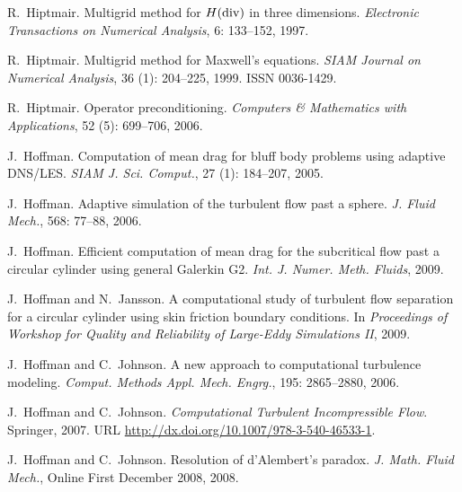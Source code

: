 \begin{thebibliography}{467}
R.~Hiptmair.
\newblock Multigrid method for {$H({\rm div})$} in three dimensions.
\newblock \emph{Electronic Transactions on Numerical Analysis}, 6:
  133--152, 1997.

R.~Hiptmair.
\newblock Multigrid method for {M}axwell's equations.
\newblock \emph{SIAM Journal on Numerical Analysis}, 36 (1):
  204--225, 1999.
\newblock ISSN 0036-1429.

R.~Hiptmair.
\newblock Operator preconditioning.
\newblock \emph{Computers \& Mathematics with Applications}, 52
  (5): 699--706, 2006.

J.~Hoffman.
\newblock Computation of mean drag for bluff body problems using adaptive
  DNS/LES.
\newblock \emph{SIAM J. Sci. Comput.}, 27 (1): 184--207,
  2005.

J.~Hoffman.
\newblock Adaptive simulation of the turbulent flow past a sphere.
\newblock \emph{J. Fluid Mech.}, 568: 77--88, 2006.

J.~Hoffman.
\newblock Efficient computation of mean drag for the subcritical flow past a
  circular cylinder using general {G}alerkin {G2}.
\newblock \emph{Int. J. Numer. Meth. Fluids}, 2009.

J.~Hoffman and N.~Jansson.
\newblock A computational study of turbulent flow separation for a circular
  cylinder using skin friction boundary conditions.
\newblock In \emph{Proceedings of Workshop for Quality and Reliability of
  Large-Eddy Simulations II}, 2009.

J.~Hoffman and C.~Johnson.
\newblock A new approach to computational turbulence modeling.
\newblock \emph{Comput. Methods Appl. Mech. Engrg.}, 195: 2865--2880,
  2006.

J.~Hoffman and C.~Johnson.
\newblock \emph{Computational Turbulent Incompressible Flow}.
\newblock Springer, 2007.
\newblock URL \url{http://dx.doi.org/10.1007/978-3-540-46533-1}.

J.~Hoffman and C.~Johnson.
\newblock Resolution of d'Alembert's paradox.
\newblock \emph{J. Math. Fluid Mech.}, Online First December 2008, 2008.


\end{thebibliography}

